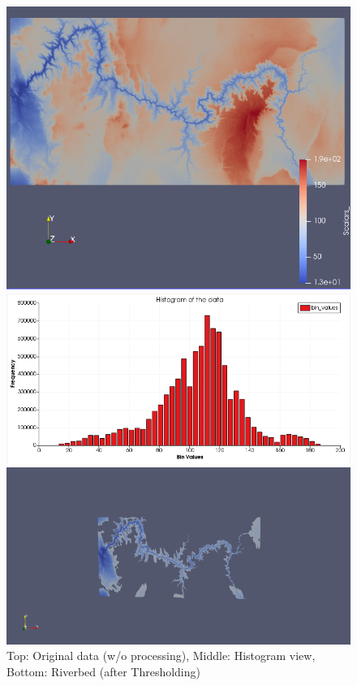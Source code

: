 \documentclass[a4paper,11pt]{article}
\theoremstyle{mytheor}
\begin{document}
\begin{figure}[!h]
    \centering
    \includegraphics[scale = 0.50]{Q2_Orig.PNG}
    
    \vspace{1 cm}
    \includegraphics[scale = 0.50]{Q2_H.PNG}
    
    \vspace{1 cm}
    \includegraphics[scale = 0.50]{Q2_R.PNG}
    \caption{Top: Original data (w/o processing), Middle: Histogram view, Bottom: Riverbed (after Thresholding)}
    \label{fig:q2}
\end{figure}
\end{document}

